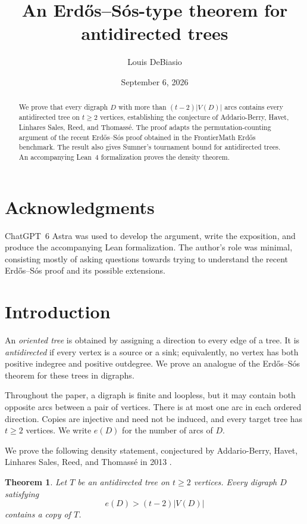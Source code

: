 \documentclass[11pt]{article}
\title{An Erd\H{o}s--S\'os-type theorem for antidirected trees}
\author{Louis DeBiasio}
\date{September 6, 2026}
\numberwithin{equation}{section}
\newtheorem{theorem}{Theorem}[section]
\theoremstyle{definition}
\begin{document}
\maketitle

\begin{abstract}
We prove that every digraph $D$ with more than $(t-2)|V(D)|$ arcs contains
every antidirected tree on $t\geq2$ vertices, establishing the conjecture of
Addario-Berry, Havet, Linhares Sales, Reed, and Thomass\'e.  The proof
adapts the permutation-counting argument of the recent Erd\H{o}s--S\'os
proof obtained in the FrontierMath Erd\H{o}s benchmark.  The result
also gives Sumner's tournament bound for antidirected trees.
An accompanying Lean~4 formalization proves the density theorem.
\end{abstract}

\section*{Acknowledgments}
ChatGPT~6 Astra was used to develop the argument, write the exposition,
and produce the accompanying Lean formalization.  The author's role
was minimal, consisting mostly of asking questions towards trying to understand
the recent Erd\H{o}s--S\'os proof and its possible extensions.

\section{Introduction}
\label{sec:introduction}

An \emph{oriented tree} is obtained by assigning a direction to every
edge of a tree.  It is \emph{antidirected} if every vertex is a source
or a sink; equivalently, no vertex has both positive indegree and
positive outdegree.  We prove an analogue of the Erd\H{o}s--S\'os
theorem for these trees in digraphs.

Throughout the paper, a digraph is finite and loopless, but it may
contain both opposite arcs between a pair of vertices.  There is at most
one arc in each ordered direction.  Copies are injective and need not be
induced, and every target tree has $t\geq2$ vertices.  We write $e(D)$ for
the number of arcs of $D$.

We prove the following density statement, conjectured
by Addario-Berry, Havet, Linhares Sales, Reed, and Thomass\'e in 2013
\cite{AddarioBerryHavetLinharesSalesReedThomasse2013}.

\begin{theorem}
\label{thm:antidirected-density}
Let $T$ be an antidirected tree on $t\geq2$ vertices.  Every digraph $D$ satisfying
\[
        e(D)>(t-2)|V(D)|
\]
contains a copy of $T$.
\end{theorem}
\end{document}
